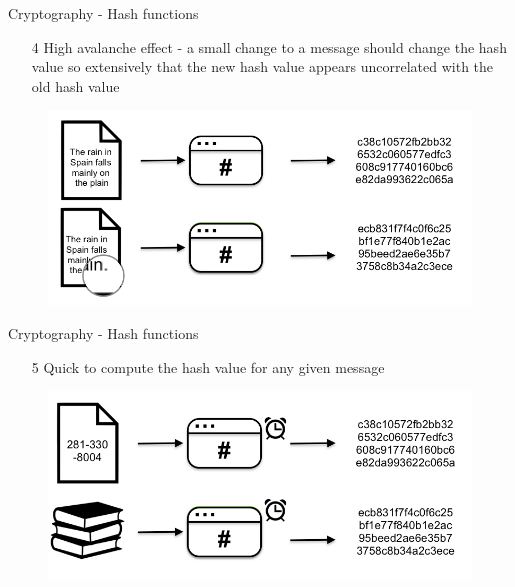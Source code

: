 \documentclass[9pt]{beamer}
\begin{document}

\begin{frame}{Cryptography - Hash functions}
	\begin{enumerate}
		\item[4] High avalanche effect - a small change to a message should change the hash value so extensively that the new hash value appears uncorrelated with the old hash value
	\end{enumerate}
	\begin{figure}[]
		\centering
		\includegraphics  [scale=0.3]{Images/hash4}
		\begin{centering}
		\end{centering}
	\end{figure}
\end{frame}


\begin{frame}{Cryptography - Hash functions}
	\begin{enumerate}
		\item[5] Quick to compute the hash value for any given message
	\end{enumerate}
	\begin{figure}[]
		\centering
		\includegraphics  [scale=0.3]{Images/hash5}
		\begin{centering}
		\end{centering}
	\end{figure}
\end{frame}
\end{document}
